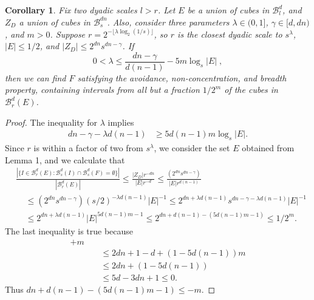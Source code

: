 \documentclass[usenames,dvipsnames]{article}
\theoremstyle{plain}
\newtheorem{corollary}{Corollary}
\theoremstyle{plain}
\begin{document}
\begin{corollary}
	Fix two dyadic scales $l > r$. Let $E$ be a union of cubes in $\mathcal{B}^d_l$, and $Z_D$ a union of cubes in $\mathcal{B}^{dn}_s$. Also, consider three parameters $\lambda \in (0,1]$, $\gamma \in [d,dn)$, and $m > 0$. Suppose $r = 2^{- \lfloor \lambda \log_2(1/s) \rfloor}$, so $r$ is the closest dyadic scale to $s^\lambda$, $|E| \leq 1/2$, and $|Z_D| \leq 2^{dn} s^{dn-\gamma}$. If
	\[ 0 < \lambda \leq \frac{dn - \gamma}{d(n-1)} - 5 m \log_s |E|\; , \]
	then we can find $F$ satisfying the avoidance, non-concentration, and breadth property, containing intervals from all but a fraction $1/2^m$ of the cubes in $\mathcal{B}^d_r(E)$.
\end{corollary}
\begin{proof}
	The inequality for $\lambda$ implies
	\begin{align*}
		dn - \gamma - \lambda d(n-1) &\geq 5d(n-1) m \log_s |E|.
	\end{align*}
	Since $r$ is within a factor of two from $s^\lambda$, we consider the set $E$ obtained from Lemma 1, and we calculate that
	\begin{align*}
		&\frac{|\{ I \in \mathcal{B}^d_r(E): \mathcal{B}^d_s(I) \cap \mathcal{B}^d_s(F) = \emptyset \}|}{|\mathcal{B}^d_r(E)|} \leq \frac{|Z_D| r^{-dn}}{|E|r^{-d}} \leq \frac{(2^{dn} s^{dn - \gamma})}{|E| r^{d(n-1)}}\\
		&\ \ \ \ \ \leq (2^{dn} s^{dn - \gamma}) (s/2)^{- \lambda d(n-1)} |E|^{-1} \leq 2^{dn + \lambda d(n-1)} s^{dn - \gamma - \lambda d(n-1)} |E|^{-1} \\
		&\ \ \ \ \ \leq 2^{dn + \lambda d(n-1)} |E|^{5d(n-1)m - 1} \leq 2^{dn + d(n-1) - (5d(n-1)m - 1)} \leq 1/2^m.
	\end{align*}
	The last inequality is true because
	\begin{align*}
		[dn + &d(n-1) - (5d(n-1)m - 1)] + m\\
		&\ \ \ \ \ \leq 2dn + 1 - d + (1 - 5d(n-1)) m\\
		&\ \ \ \ \ \leq 2dn + (1 - 5d(n-1))\\
		&\ \ \ \ \ \leq 5d-3dn + 1 \leq 0.
	\end{align*}
	Thus $dn + d(n-1) - (5d(n-1)m - 1) \leq -m$.
\end{proof}
\end{document}
